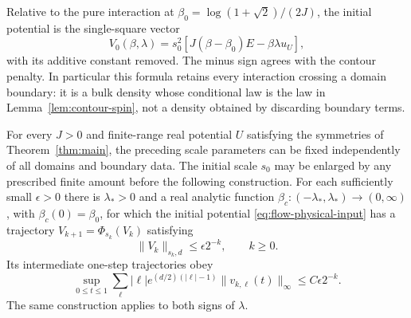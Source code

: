 Relative to the pure interaction at
\(\beta_0=\log(1+\sqrt2)/(2J)\), the initial potential is the
single-square vector
\begin{equation}\label{eq:flow-physical-input}
 V_0(\beta,\lambda)=s_0^2
 \left[J(\beta-\beta_0)E-\beta\lambda u_U\right],
\end{equation}
with its additive constant removed.  The minus sign agrees with the
contour penalty.  In particular this formula retains every interaction
crossing a domain boundary: it is a bulk density whose conditional law
is the law in Lemma~\ref{lem:contour-spin}, not a density obtained by
discarding boundary terms.

\begin{theorem}
\label{thm:critical-trajectory}
For every \(J>0\) and finite-range real potential \(U\) satisfying the
symmetries of Theorem~\ref{thm:main}, the preceding scale parameters can
be fixed independently of all domains and boundary data.  The initial
scale \(s_0\) may be enlarged by any prescribed finite amount before the
following construction.  For each sufficiently small \(\epsilon>0\)
there is \(\lambda_*>0\) and a real analytic function
\(\beta_c:(-\lambda_*,\lambda_*)\to(0,\infty)\), with
\(\beta_c(0)=\beta_0\), for which the initial potential
\eqref{eq:flow-physical-input} has a trajectory
\(V_{k+1}=\Phi_{s_k}(V_k)\) satisfying
\begin{equation}\label{eq:flow-critical-decay}
 \|V_k\|_{s_k,d}\le\epsilon2^{-k},\qquad k\ge0.
\end{equation}
Its intermediate one-step trajectories obey
\begin{equation}\label{eq:flow-critical-intermediate}
 \sup_{0\le t\le1}
 \sum_\ell |\ell|e^{(d/2)(|\ell|-1)}
 \|v_{k,\ell}(t)\|_\infty\le C\epsilon2^{-k}.
\end{equation}
The same construction applies to both signs of \(\lambda\).
\end{theorem}

